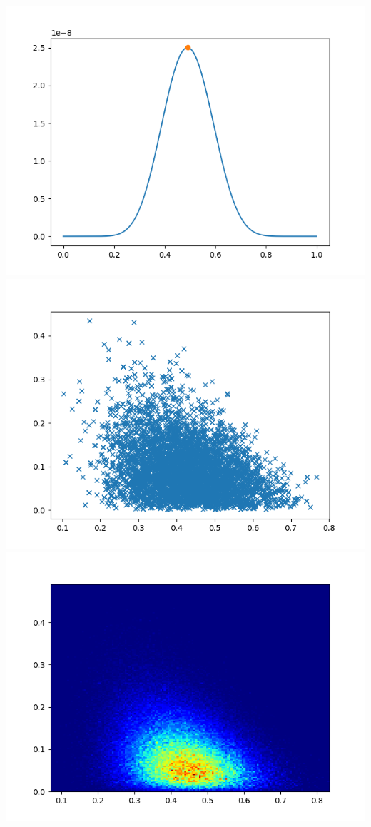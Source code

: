 \documentclass[pt12]{article}
\begin{document}
\newpage
\begin{center}
\includegraphics[scale=0.5]{hip30.png}\\
\includegraphics[scale=0.5]{sc30.png}\\
\includegraphics[scale=0.5]{den30.png}\\
\end{center}
\end{document}

